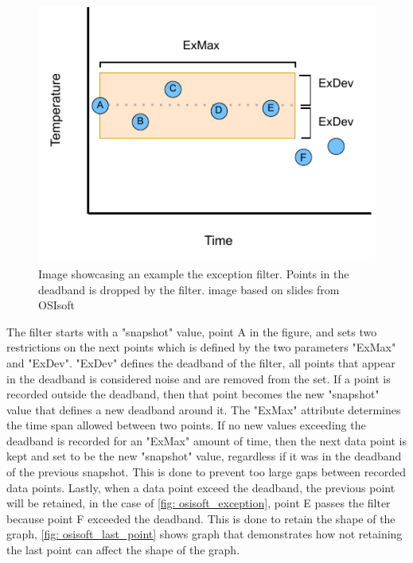 \documentclass[main.tex]{subfiles}
\begin{document}
\begin{figure}[!ht]
    \centering
    \includegraphics[scale=1.3]{images/exception_process.pdf}
    \caption{Image showcasing an example the exception filter. Points in the deadband is dropped by the filter. image based on slides from OSIsoft\cite{osisoft_image}}
    \label{fig: osisoft_exception}
\end{figure}
\FloatBarrier 
 
The filter starts with a "snapshot" value, point A in the figure, and sets two restrictions on the next points which is defined by the two parameters "ExMax" and "ExDev". "ExDev" defines the deadband of the filter, all points that appear in the deadband is considered noise and are removed from the set. If a point is recorded outside the deadband, then that point becomes the new "snapshot" value that defines a new deadband around it. The "ExMax" attribute determines the time span allowed between two points. If no new values exceeding the deadband is recorded for an "ExMax" amount of time, then the next data point is kept and set to be the new "snapshot" value, regardless if it was in the deadband of the previous snapshot. This is done to prevent too large gaps between recorded data points. Lastly, when a data point exceed the deadband, the previous point will be retained, in the case of \autoref{fig: osisoft_exception}, point E passes the filter because point F exceeded the deadband. This is done to retain the shape of the graph, \autoref{fig: osisoft_last_point} shows graph that demonstrates how not retaining the last point can affect the shape of the graph.
\end{document}
